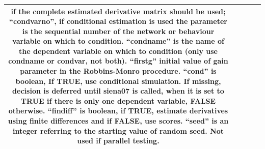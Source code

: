 \documentclass[a4paper,fleqn,11pt]{article}
\newcommand{\+}{\, + \,}
\begin{document}
\begin{landscape}
\begin{small}
\begin{longtable}{c | p{2.4cm} | p{4.5cm} | p{4.0cm} | p{9.0cm} }
if the complete estimated derivative matrix should be used; ``condvarno'', if
conditional estimation is used the parameter is the sequential number of the
network or behaviour variable on which to condition. ``condname'' is the name
of the dependent variable on which to condition (only use condname or condvar,
not both). ``firstg'' initial value of gain parameter in the Robbins-Monro
procedure. ``cond'' is boolean, If TRUE, use conditional simulation. If
missing, decision is deferred until siena07 is called, when it is set to TRUE
if there is only one dependent variable, FALSE otherwise. ``findiff'' is
boolean, if TRUE, estimate derivatives using finite differences and if FALSE,
use scores. ``seed'' is an integer referring to the starting value of random
seed. Not used if parallel
testing.\\
\hline


\end{longtable}
\end{small}
\end{landscape}
\end{document}
